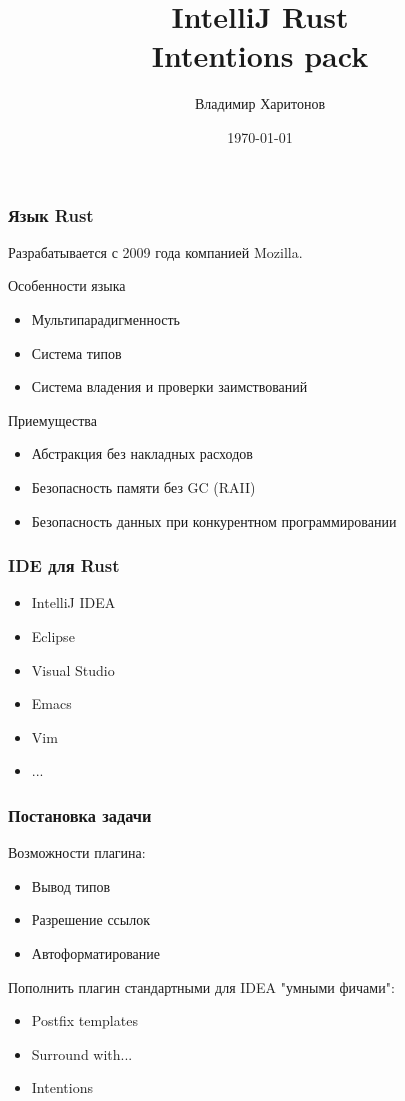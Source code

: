 \documentclass[10pt,pdf,hyperref={unicode}]{beamer}
\title[IntelliJ Rust Intentions pack]{IntelliJ Rust \\ Intentions pack}
\institute[]{ Computer Science Center \\
	Руководитель: Алексей Кладов
}
\author{Владимир Харитонов}
\date{\today}
\begin{document}
\begin{frame}
\titlepage
\end{frame} 

\begin{frame}
\frametitle{Язык Rust} 
	Разрабатывается с 2009 года компанией Mozilla.
	\begin{block}{Особенности языка}
	\begin{itemize}
		\item Мультипарадигменность 
		\item Система типов
		\item Система владения и проверки заимствований
	\end{itemize}
	\end{block}
		\begin{block}{Приемущества}
			\begin{itemize}
				\item Абстракция без накладных расходов 
				\item Безопасность памяти без GC (RAII)
				\item Безопасность данных при конкурентном программировании
			\end{itemize}
		\end{block}
\end{frame}

\begin{frame}
	\frametitle{IDE для Rust} 
	\begin{itemize}
		\item IntelliJ IDEA
		\item Eclipse
		\item Visual Studio
		\item Emacs
		\item Vim
		\item ...
	\end{itemize}
\end{frame}

\begin{frame}
	\frametitle{Постановка задачи} 
	Возможности плагина:
	\begin{itemize}
		\item Вывод типов
		\item Разрешение ссылок
		\item Автоформатирование
	\end{itemize}
	\vfill
	Пополнить плагин стандартными для IDEA "умными фичами":
	\begin{itemize}
		\item Postfix templates
		\item Surround with...
		\item Intentions
	\end{itemize}
\end{frame}
\end{document}
